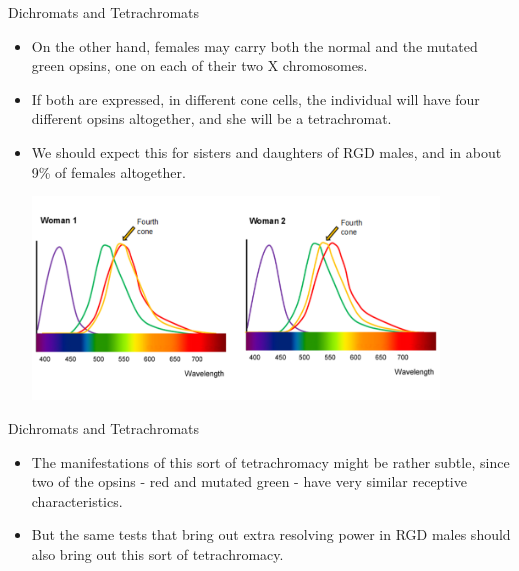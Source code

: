 \documentclass{beamer}
\begin{document}
\begin{frame}{Dichromats and Tetrachromats}
   \begin{itemize}
      \item On the other hand, females may carry both the normal and the mutated green opsins, one on each of their two X chromosomes.
      \item If both are expressed, in different cone cells, the individual will have four different opsins altogether, and she will be a tetrachromat.
      \item We should expect this for sisters and daughters of RGD males, and in about 9\% of females altogether.
   \begin{center}
      \includegraphics[width=0.85\textwidth]{figures/fourcones.png}
   \end{center}
   \end{itemize}
\end{frame}

\begin{frame}{Dichromats and Tetrachromats}
   \begin{itemize}
      \item The manifestations of this sort of tetrachromacy might be rather subtle, since two of the opsins - red and mutated green - have very similar receptive characteristics.
      \item But the same tests that bring out extra resolving power in RGD males should also bring out this sort of tetrachromacy.
   \end{itemize}
\end{frame}
\end{document}
